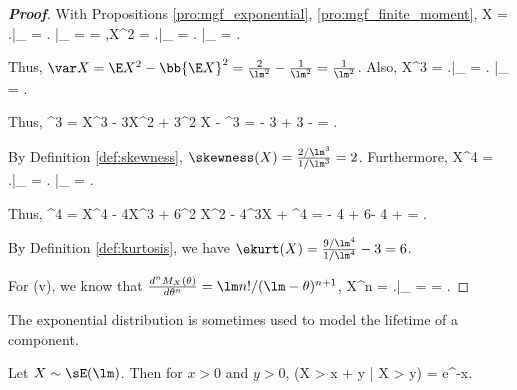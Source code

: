 \begin{proof}[\bf Proof]%
With Propositions \ref{pro:mgf_exponential}, \ref{pro:mgf_finite_moment},
\beast
\E X = \left.\right|_{} = \left. \right|_{} =  = ,\qquad \E X^2 = \left.\right|_{} = \left.  \right|_{} = .
\eeast

Thus, $\var X = \E X^2 - \bb{\E X}^2 = \frac{2}{\lm^2} - \frac{1}{\lm^2} = \frac{1}{\lm^2}$. Also,
\be
\E X^3 = \left.\right|_{} = \left.   \right|_{} = .
\ee

Thus,
\be
\E{}^3 = \E X^3 - 3\mu\E X^2 + 3\mu^2 \E X - \mu^3 =  - 3   + 3   -  = .
\ee

By Definition \ref{def:skewness}, $\skewness(X) = \frac{2/\lm^3}{1/\lm^3} = 2$. Furthermore,
\be
\E X^4 = \left.\right|_{} = \left.   \right|_{}  = .
\ee

Thus,
\be
\E{}^4 = \E X^4 - 4\mu\E X^3 + 6\mu^2 \E X^2 - 4\mu^3\E X + \mu^4 =  - 4 + 6- 4 +  =  .
\ee

By Definition \ref{def:kurtosis}, we have $\ekurt(X) = \frac{9/\lm^4}{1/\lm^4} -3 = 6$.

For (v), we know that $\frac {d^n M_X(\theta)}{d\theta^n} = \lm n!/(\lm -\theta)^{n+1}$,
\be
\E X^n = \left.\right|_{} =  = .
\ee
\end{proof}

The exponential distribution is sometimes used to model the lifetime of a component. %

\begin{proposition}\label{pro:memoryless_exponential_rv}
Let $X\sim \sE(\lm)$. Then for $x > 0$ and $y > 0$,
\be
\pro (X > x + y | X > y) = e^{-\lm x}.
\ee
\end{proposition}

